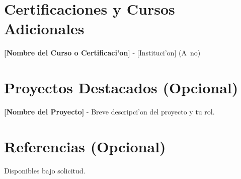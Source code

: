 \documentclass[a4paper,10pt]{article}
\begin{document}
\section*{Certificaciones y Cursos Adicionales}
\textbf{[Nombre del Curso o Certificaci'on]} - [Instituci'on] \hfill (A~no)

\section*{Proyectos Destacados (Opcional)}
\textbf{[Nombre del Proyecto]} - Breve descripci'on del proyecto y tu rol.

\section*{Referencias (Opcional)}
Disponibles bajo solicitud.
\end{document}
